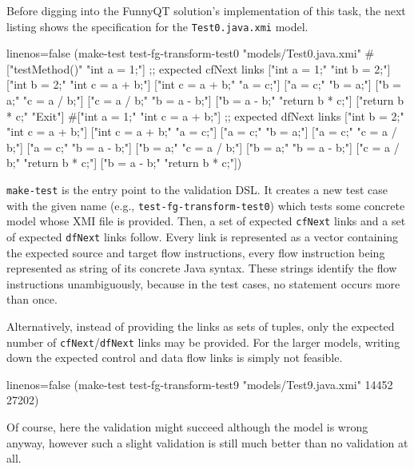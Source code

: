 \documentclass[11pt]{article}
\begin{document}
Before digging into the FunnyQT solution's implementation of this task, the
next listing shows the specification for the \verb|Test0.java.xmi| model.

\begin{clojurecode*}{linenos=false}
(make-test test-fg-transform-test0 "models/Test0.java.xmi"
           #{["testMethod()"   "int a = 1;"]     ;; expected cfNext links
             ["int a = 1;"     "int b = 2;"]
             ["int b = 2;"     "int c = a + b;"]
             ["int c = a + b;" "a = c;"]
             ["a = c;"         "b = a;"]
             ["b = a;"         "c = a / b;"]
             ["c = a / b;"     "b = a - b;"]
             ["b = a - b;"     "return b * c;"]
             ["return b * c;"  "Exit"]}
           #{["int a = 1;"     "int c = a + b;"] ;; expected dfNext links
             ["int b = 2;"     "int c = a + b;"]
             ["int c = a + b;" "a = c;"]
             ["a = c;"         "b = a;"]
             ["a = c;"         "c = a / b;"]
             ["a = c;"         "b = a - b;"]
             ["b = a;"         "c = a / b;"]
             ["b = a;"         "b = a - b;"]
             ["c = a / b;"     "return b * c;"]
             ["b = a - b;"     "return b * c;"]})
\end{clojurecode*}

\verb|make-test| is the entry point to the validation DSL.  It creates a new
test case with the given name (e.g., \verb|test-fg-transform-test0|) which
tests some concrete model whose XMI file is provided.  Then, a set of expected
\verb|cfNext| links and a set of expected \verb|dfNext| links follow.  Every
link is represented as a vector containing the expected source and target flow
instructions, every flow instruction being represented as string of its
concrete Java syntax.  These strings identify the flow instructions
unambiguously, because in the test cases, no statement occurs more than once.

Alternatively, instead of providing the links as sets of tuples, only the
expected number of \verb|cfNext|/\verb|dfNext| links may be provided.  For the
larger models, writing down the expected control and data flow links is simply
not feasible.

\begin{clojurecode*}{linenos=false}
(make-test test-fg-transform-test9 "models/Test9.java.xmi" 14452 27202)
\end{clojurecode*}

Of course, here the validation might succeed although the model is wrong
anyway, however such a slight validation is still much better than no
validation at all.
\end{document}
